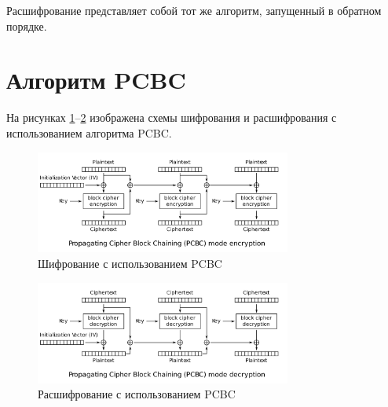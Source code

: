 Расшифрование представляет собой тот же алгоритм, запущенный в обратном порядке.

\newpage

\section{Алгоритм PCBC}

На рисунках \ref{fig:pcbc_enc.png}--\ref{fig:pcbc_dec.png} изображена схемы шифрования и расшифрования с использованием алгоритма PCBC.

\begin{figure}[h!]
\centering
\includegraphics[width=0.75\textwidth]{assets/pcbc_enc.png}
\caption{Шифрование с использованием PCBC}
\label{fig:pcbc_enc.png}
\end{figure}

\begin{figure}[h!]
\centering
\includegraphics[width=0.75\textwidth]{assets/pcbc_dec.png}
\caption{Расшифрование с использованием PCBC}
\label{fig:pcbc_dec.png}
\end{figure}


